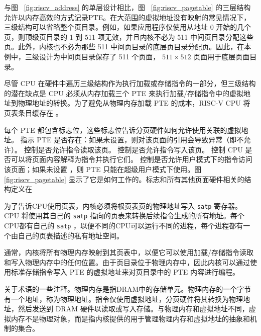 与图~    \ref{fig:riscv_address}    的单层设计相比，图~    \ref{fig:riscv_pagetable}    的三层结构允许以内存高效的方式记录PTE。在大范围的虚拟地址没有映射的常见情况下，三级结构可以省略整个页目录。例如，如果应用程序仅使用从地址 0 开始的几个页，则顶级页目录的 1 到 511 项无效，并且内核不必为 511 中间页目录分配这些页。此外，内核也不必为那些 511 中间页目录的底层页目录分配页。因此，在本例中，三级设计为中间页目录保存了 511 个页面，
    $511\times512$    页面用于底层页面目录。  

尽管 CPU 在硬件中遍历三级结构作为执行加载或存储指令的一部分，但三级结构的潜在缺点是 CPU 必须从内存加载三个 PTE 来执行加载/存储指令中的虚拟地址到物理地址的转换。为了避免从物理内存加载 PTE 的成本，RISC-V CPU 将页表条目缓存在
        。  

每个 PTE 都包含标志位，这些标志位告诉分页硬件如何允许使用关联的虚拟地址。
        指示 PTE 是否存在：如果未设置，则对该页面的引用会导致异常（即不允许）。
        控制是否允许指令读取该页。
        控制是否允许指令写入该页。
        控制 CPU 是否可以将页面内容解释为指令并执行它们。
        控制是否允许用户模式下的指令访问该页面；如果未设置       ，则 PTE 只能在超级用户模式下使用。图~    \ref{fig:riscv_pagetable}    显示了它是如何工作的。标志和所有其他页面硬件相关的结构定义在

为了告诉CPU使用页表，内核必须将根页表页的物理地址写入
    \texttt{satp}           寄存器。 CPU 将使用其自己的    \texttt{satp}    指向的页表来转换后续指令生成的所有地址。每个CPU都有自己的   \texttt{satp}   ，以便不同的CPU可以运行不同的进程，每个进程都有一个由自己的页表描述的私有地址空间。  

通常，内核将所有物理内存映射到其页表中，以便它可以使用加载/存储指令读取和写入物理内存中的任何位置。由于页目录位于物理内存中，因此内核可以通过使用标准存储指令写入 PTE 的虚拟地址来对页目录中的 PTE 内容进行编程。  

关于术语的一些注释。物理内存是指DRAM中的存储单元。物理内存的一个字节有一个地址，称为物理地址。指令仅使用虚拟地址，分页硬件将其转换为物理地址，然后发送到 DRAM 硬件以读取或写入存储。与物理内存和虚拟地址不同，虚拟内存不是物理对象，而是指内核提供的用于管理物理内存和虚拟地址的抽象和机制的集合。  

